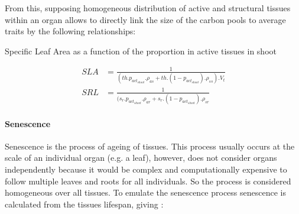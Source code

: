\indent From this, supposing homogeneous distribution of active and structural tissues within an organ allows to directly link the size of the carbon pools to average traits by the following relationships:
\begin{marginfigure}
\label{fig:SLA}
\caption{Specific Leaf Area as a function of the proportion in active tissues in shoot}
\end{marginfigure}

\begin{align}
  SLA &= \frac{1}{(th .  p_{act_{shoot}} . \rho_{as} + th . (1 -  p_{act_{shoot}}) . \rho_{ss} ) . V_{t}}\\
  SRL &= \frac{1}{(s_{r} .  p_{act_{shoot}} . \rho_{ar} + s_{r}.(1 -  p_{act_{shoot}}) . \rho_{sr}}
\end{align}


\paragraph{Senescence}

Senescence is the process of ageing of tissues. This process usually occurs at the scale of an individual organ (e.g. a leaf), however, \model does not consider organs independently because it would be complex and computationally expensive to follow multiple leaves and roots for all individuals. So the process is considered homogeneous over all tissues. To emulate the senescence process senescence is calculated from the tissues lifespan, giving :

